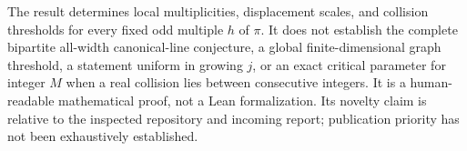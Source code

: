 The result determines local multiplicities, displacement scales, and
collision thresholds for every fixed odd multiple $h$ of $\pi$.
It does not establish the complete bipartite all-width canonical-line
conjecture, a global finite-dimensional graph threshold, a statement
uniform in growing $j$, or an exact critical parameter for integer
$M$ when a real collision lies between consecutive integers. It is a
human-readable mathematical proof, not a Lean formalization. Its novelty
claim is relative to the inspected repository and incoming report;
publication priority has not been exhaustively established.
